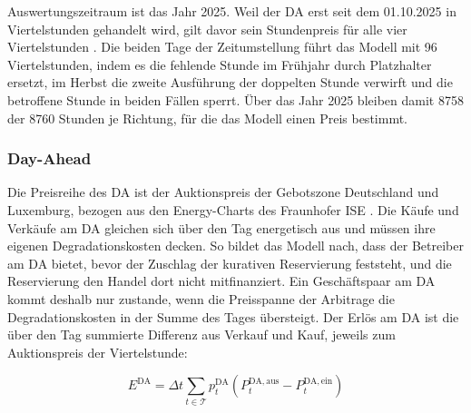 Auswertungszeitraum ist das Jahr 2025.
Weil der \ac{DA} erst seit dem 01.10.2025 in Viertelstunden gehandelt wird, gilt davor sein Stundenpreis für alle vier Viertelstunden \cite{ffe_saegezahn_2026}.
Die beiden Tage der Zeitumstellung führt das Modell mit 96 Viertelstunden, indem es die fehlende Stunde im Frühjahr durch Platzhalter ersetzt, im Herbst die zweite Ausführung der doppelten Stunde verwirft und die betroffene Stunde in beiden Fällen sperrt.
Über das Jahr 2025 bleiben damit 8758 der 8760 Stunden je Richtung, für die das Modell einen Preis bestimmt.

\subsubsection*{Day-Ahead}
Die Preisreihe des \ac{DA} ist der Auktionspreis der Gebotszone Deutschland und Luxemburg, bezogen aus den Energy-Charts des Fraunhofer ISE \cite{energy_charts_strompreise_2026}.
Die Käufe und Verkäufe am \ac{DA} gleichen sich über den Tag energetisch aus und müssen ihre eigenen Degradationskosten decken.
So bildet das Modell nach, dass der Betreiber am \ac{DA} bietet, bevor der Zuschlag der kurativen Reservierung feststeht, und die Reservierung den Handel dort nicht mitfinanziert.
Ein Geschäftspaar am \ac{DA} kommt deshalb nur zustande, wenn die Preisspanne der Arbitrage die Degradationskosten in der Summe des Tages übersteigt.
Der Erlös am \ac{DA} ist die über den Tag summierte Differenz aus Verkauf und Kauf, jeweils zum Auktionspreis der Viertelstunde:

\begin{equation}
    \label{eq:erloes_da}
    E^{\mathrm{DA}} = \Delta t \sum_{t \in \mathcal{T}} p^{\mathrm{DA}}_t \left( P^{\mathrm{DA,aus}}_t - P^{\mathrm{DA,ein}}_t \right)
\end{equation}

